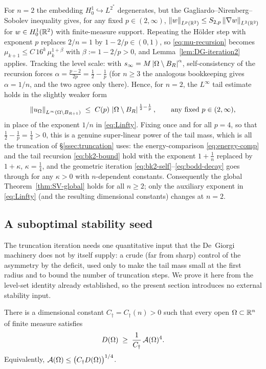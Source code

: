 \begin{remark}[The case $n=2$]\label{rem:n2}
For $n=2$ the embedding $H^1_0\hookrightarrow L^{2^*}$ degenerates, but
the Gagliardo--Nirenberg--Sobolev inequality gives, for any fixed
$p\in(2,\infty)$,
$\left\|w\right\|_{L^{p}(\mathbb R^2)}\le S_{2,p}\left\|\nabla w\right\|_{L^2(\mathbb R^2)}$ for
$w\in H^1_0(\mathbb R^2)$ with finite-measure support. Repeating the Hölder step with
exponent $p$ replaces $2/n=1$ by $1-2/p\in(0,1)$, so
\eqref{eq:mu-recursion} becomes
$\mu_{k+1}\le C\,16^k\,\mu_k^{1+\beta}$ with $\beta:=1-2/p>0$, and
Lemma~\ref{lem:DG-iteration2} applies. Tracking the level scale: with
$s_\infty=M\left|\Omega\setminus B_R\right|^{\alpha}$, self-consistency of the
recursion forces $\alpha=\tfrac{p-2}{2p}=\tfrac12-\tfrac1p$ (for $n\ge3$
the analogous bookkeeping gives $\alpha=1/n$, and the two agree only there).
Hence, for $n=2$, the $L^\infty$ tail estimate holds in the slightly weaker
form
\[
   \left\|u_\Omega\right\|_{L^\infty(\Omega\setminus B_{R+1})}
   \;\le\;C(p)\,\left|\Omega\setminus B_R\right|^{\,\frac12-\frac1p},
   \qquad\text{any fixed }p\in(2,\infty),
\]
in place of the exponent $1/n$ in \eqref{eq:Linfty}. Fixing once and for
all $p=4$, so that $\tfrac12-\tfrac1p=\tfrac14>0$, this is a genuine
super-linear power of the tail mass, which is all the truncation of
\S\ref{ssec:truncation} uses: the energy-comparison
\eqref{eq:energy-comp} and the tail recursion \eqref{eq:bk2-bound} hold
with the exponent $1+\tfrac1n$ replaced by $1+\kappa$, $\kappa=\tfrac14$,
and the geometric iteration \eqref{eq:bk2-self}--\eqref{eq:bodd-decay} goes
through for any $\kappa>0$ with $n$-dependent constants. Consequently the
global Theorem~\ref{thm:SV-global} holds for all $n\ge2$; only the
auxiliary exponent in \eqref{eq:Linfty} (and the resulting dimensional
constants) changes at $n=2$.
\end{remark}

\subsection{A suboptimal stability seed}\label{ssec:seed}

The truncation iteration needs one quantitative input that the De~Giorgi
machinery does not by itself supply: a crude (far from sharp) control of the
asymmetry by the deficit, used only to make the tail mass small at the first
radius and to bound the number of truncation steps. We prove it here from the
level-set identity already established, so the present section introduces no
external stability input.

\begin{lemma}\label{lem:seed}
There is a dimensional constant $C_\dagger=C_\dagger(n)>0$ such that every
open $\Omega\subset\mathbb R^n$ of finite measure satisfies
\begin{equation}\label{eq:seed}
   D(\Omega)\;\ge\;\frac{1}{C_\dagger}\,\mathcal A(\Omega)^{4}.
\end{equation}
Equivalently, $\mathcal A(\Omega)\le\bigl(C_\dagger D(\Omega)\bigr)^{1/4}$.
\end{lemma}

